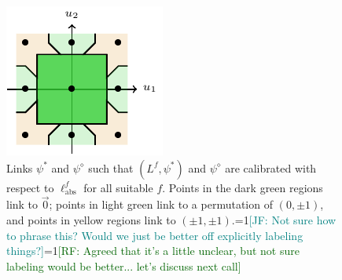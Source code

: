 \documentclass[11pt]{article}
\newcommand{\Comments}{1}
\newcommand{\mynote}[2]{\ifnum\Comments=1\textcolor{#1}{#2}\fi}
\newcommand{\raf}[1]{\mynote{darkgreen}{[RF: #1]}}
\newcommand{\jessie}[1]{\mynote{teal}{[JF: #1]}}
\newcommand{\ellabs}{\ell_{\text{abs}}^f}
\begin{document}
\begin{figure}
\begin{center}
\begin{minipage}{0.48\linewidth}
			\includegraphics[width=\linewidth]{tikz/lovasz-link-psi-diamond.pdf}
		\end{minipage}\hfill
		\caption{Links $\psi^*$ and $\psi^\diamond$ such that $(L^f, \psi^*)$ and $\psi^\diamond$ are calibrated with respect to $\ellabs$ for all suitable $f$. Points in the dark green regions link to $\vec 0$; points in light green link to a permutation of $(0,\pm 1)$, and points in yellow regions link to $(\pm 1, \pm 1)$.\jessie{Not sure how to phrase this?  Would we just be better off explicitly labeling things?}\raf{Agreed that it's a little unclear, but not sure labeling would be better... let's discuss next call}}
		\label{fig:lovasz-links}
	\end{center}
\end{figure}
\end{document}
